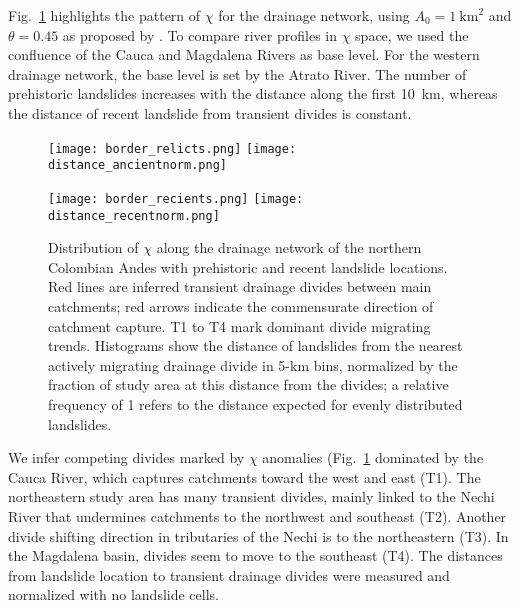 \documentclass[draft]{agujournal2019}
\begin{document}
\par Fig.~\ref{fig:rel-rec} highlights the pattern of $\chi$ for the drainage network, using $A_0=1~\mathrm{km}^2$ and $\theta=0.45$ as proposed by . To compare river profiles in $\chi$ space, we used the confluence of the Cauca and Magdalena Rivers as base level. For the western drainage network, the base level is set by the Atrato River. The number of prehistoric landslides increases with the distance along the first 10~km, whereas the distance of recent landslide from transient divides is constant.

\begin{figure}[ht!]
  \begin{minipage}{.48\linewidth}
    \centering
      {\texttt{[image: border\_relicts.png]}}
      {\texttt{[image: distance\_ancientnorm.png]}}
  \end{minipage}\quad
  \begin{minipage}{.48\linewidth}
    \centering
      {\texttt{[image: border\_recients.png]}}
      {\texttt{[image: distance\_recentnorm.png]}}
  \end{minipage}
    \caption{Distribution of $\chi$ along the drainage network of the northern Colombian Andes with prehistoric and recent landslide locations. Red lines are inferred transient drainage divides between main catchments; red arrows indicate the commensurate direction of catchment capture. T1 to T4 mark dominant divide migrating trends. Histograms show the distance of landslides from the nearest actively migrating drainage divide in 5-km bins, normalized by the fraction of study area at this distance from the divides; a relative frequency of 1 refers to the distance expected for evenly distributed landslides.}
    \label{fig:rel-rec}
\end{figure}

\par We infer competing divides marked by $\chi$ anomalies (Fig.~\ref{fig:rel-rec} dominated by the Cauca River, which captures catchments toward the west and east (T1). The northeastern study area has many transient divides, mainly linked to the Nechi River that undermines catchments to the northwest and southeast (T2). Another divide shifting direction in tributaries of the Nechi is to the northeastern (T3). In the Magdalena basin, divides seem to move to the southeast (T4). The distances from landslide location to transient drainage divides were measured and normalized with no landslide cells.
\end{document}
